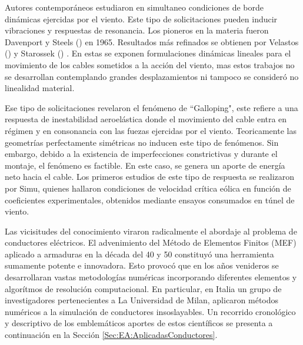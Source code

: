 Autores contemporáneos estudiaron en simultaneo condiciones de borde dinámicas ejercidas por el viento. Este tipo de solicitaciones pueden inducir vibraciones y respuestas de resonancia. Los pioneros en la materia fueron Davenport y Steels (\citep{Davenport1965}) en 1965. Resultados más refinados se obtienen por Velastos (\citep{Veletsos1983}) y Starossek (\cite{Starossek1991}) . En estas se exponen formulaciones dinámicas lineales para el movimiento de los cables sometidos a la acción del viento, mas estos trabajos no se desarrollan contemplando grandes desplazamientos ni tampoco se consideró no linealidad material. 

Ese tipo de solicitaciones revelaron el fenómeno de ``Galloping", este refiere a una respuesta de inestabilidad aeroelástica donde el movimiento del cable entra en régimen y en consonancia con las fuezas ejercidas por el viento. Teoricamente las geometrías perfectamente simétricas no inducen este tipo de fenómenos. Sin embargo, debido a la existencia de imperfecciones constrictivas y durante el montaje, el fenómeno es factible. En este caso, se genera un aporte de energía neto hacia el cable. Los primeros estudios de este tipo de respuesta se realizaron por Simu, quienes hallaron condiciones de velocidad crítica eólica en función de coeficientes experimentales, obtenidos mediante ensayos consumados en túnel de viento. \citep{Simiu1986}

Las vicisitudes del conocimiento viraron radicalmente el abordaje al problema de conductores eléctricos. El advenimiento del Método de Elementos Finitos (MEF) aplicado a armaduras en la década del 40 y 50 constituyó una herramienta sumamente potente e innovadora. Esto provocó que en los años venideros se desarrollaran vastas metodologías numéricas incorporando diferentes elementos y algorítmos de resolución computacional. En particular, en Italia un grupo de investigadores pertenecientes a La Universidad de Milan, aplicaron métodos numéricos a la simulación de conductores insoslayables. Un recorrido cronológico y descriptivo de los emblemáticos aportes de estos científicos se presenta a continuación en la Sección \ref{Sec:EA:AplicadasConductores}.

